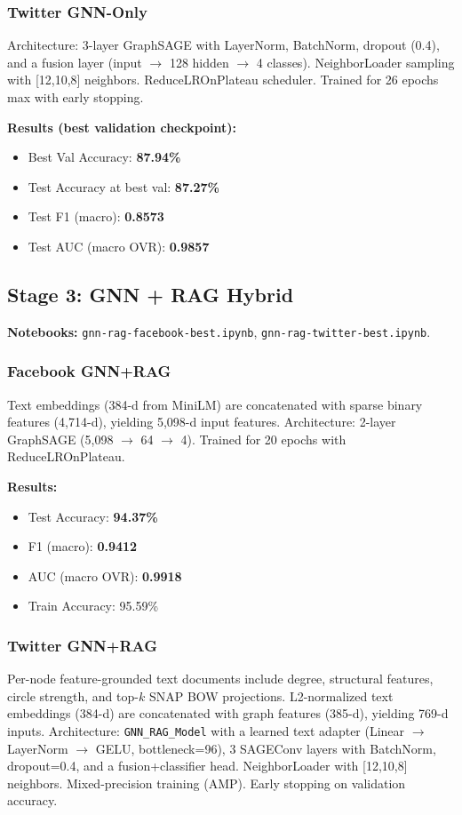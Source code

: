 \documentclass[conference]{IEEEtran}
\begin{document}
\subsubsection{Twitter GNN-Only}
Architecture: 3-layer GraphSAGE with LayerNorm, BatchNorm, dropout (0.4), and a fusion layer (input $\rightarrow$ 128 hidden $\rightarrow$ 4 classes). NeighborLoader sampling with [12,10,8] neighbors. ReduceLROnPlateau scheduler. Trained for 26 epochs max with early stopping.

\textbf{Results (best validation checkpoint):}
\begin{itemize}
  \item Best Val Accuracy: \textbf{87.94\%}
  \item Test Accuracy at best val: \textbf{87.27\%}
  \item Test F1 (macro): \textbf{0.8573}
  \item Test AUC (macro OVR): \textbf{0.9857}
\end{itemize}

\subsection{Stage 3: GNN + RAG Hybrid}
\textbf{Notebooks:} \texttt{gnn-rag-facebook-best.ipynb}, \texttt{gnn-rag-twitter-best.ipynb}.

\subsubsection{Facebook GNN+RAG}
Text embeddings (384-d from MiniLM) are concatenated with sparse binary features (4{,}714-d), yielding 5{,}098-d input features. Architecture: 2-layer GraphSAGE (5{,}098 $\rightarrow$ 64 $\rightarrow$ 4). Trained for 20 epochs with ReduceLROnPlateau.

\textbf{Results:}
\begin{itemize}
  \item Test Accuracy: \textbf{94.37\%}
  \item F1 (macro): \textbf{0.9412}
  \item AUC (macro OVR): \textbf{0.9918}
  \item Train Accuracy: 95.59\%
\end{itemize}

\subsubsection{Twitter GNN+RAG}
Per-node feature-grounded text documents include degree, structural features, circle strength, and top-$k$ SNAP BOW projections. L2-normalized text embeddings (384-d) are concatenated with graph features (385-d), yielding 769-d inputs. Architecture: \texttt{GNN\_RAG\_Model} with a learned text adapter (Linear $\rightarrow$ LayerNorm $\rightarrow$ GELU, bottleneck=96), 3 SAGEConv layers with BatchNorm, dropout=0.4, and a fusion+classifier head. NeighborLoader with [12,10,8] neighbors. Mixed-precision training (AMP). Early stopping on validation accuracy.
\end{document}
